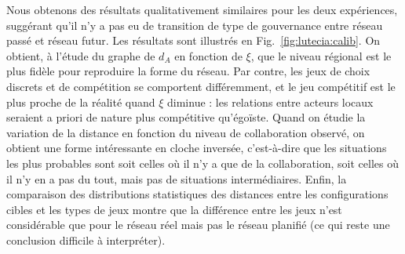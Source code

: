 Nous obtenons des résultats qualitativement similaires pour les deux expériences, suggérant qu'il n'y a pas eu de transition de type de gouvernance entre réseau passé et réseau futur. Les résultats sont illustrés en Fig.~\ref{fig:lutecia:calib}. On obtient, à l'étude du graphe de $d_A$ en fonction de $\xi$, que le niveau régional est le plus fidèle pour reproduire la forme du réseau. Par contre, les jeux de choix discrets et de compétition se comportent différemment, et le jeu compétitif est le plus proche de la réalité quand $\xi$ diminue : les relations entre acteurs locaux seraient a priori de nature plus compétitive qu'égoïste. Quand on étudie la variation de la distance en fonction du niveau de collaboration observé, on obtient une forme intéressante en cloche inversée, c'est-à-dire que les situations les plus probables sont soit celles où il n'y a que de la collaboration, soit celles où il n'y en a pas du tout, mais pas de situations intermédiaires. Enfin, la comparaison des distributions statistiques des distances entre les configurations cibles et les types de jeux montre que la différence entre les jeux n'est considérable que pour le réseau réel mais pas le réseau planifié (ce qui reste une conclusion difficile à interpréter).



